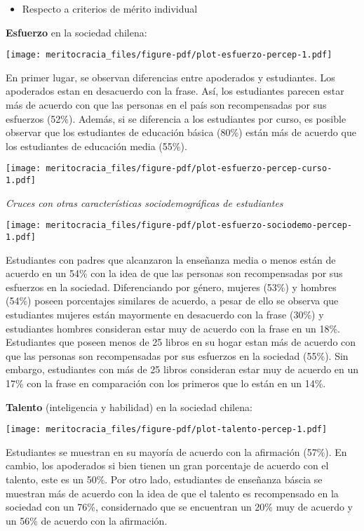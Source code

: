 \documentclass[
  letterpaper,
  DIV=11,
  numbers=noendperiod]{scrreprt}
\providecommand{\tightlist}{%
  \setlength{\itemsep}{0pt}\setlength{\parskip}{0pt}}\usepackage{longtable,booktabs,array}
\begin{document}
\begin{itemize}
\tightlist
\item
  Respecto a criterios de mérito individual
\end{itemize}

\textbf{Esfuerzo} en la sociedad chilena:

\texttt{[image: meritocracia\_files/figure-pdf/plot-esfuerzo-percep-1.pdf]}

En primer lugar, se observan diferencias entre apoderados y estudiantes.
Los apoderados estan en desacuerdo con la frase. Así, los estudiantes
parecen estar más de acuerdo con que las personas en el país son
recompensadas por sus esfuerzos (52\%). Además, si se diferencia a los
estudiantes por curso, es posible observar que los estudiantes de
educación básica (80\%) están más de acuerdo que los estudiantes de
educación media (55\%).

\texttt{[image: meritocracia\_files/figure-pdf/plot-esfuerzo-percep-curso-1.pdf]}

\emph{Cruces con otras características sociodemográficas de estudiantes}

\texttt{[image: meritocracia\_files/figure-pdf/plot-esfuerzo-sociodemo-percep-1.pdf]}

Estudiantes con padres que alcanzaron la enseñanza media o menos están
de acuerdo en un 54\% con la idea de que las personas son recompensadas
por sus esfuerzos en la sociedad. Diferenciando por género, mujeres
(53\%) y hombres (54\%) poseen porcentajes similares de acuerdo, a pesar
de ello se observa que estudiantes mujeres están mayormente en
desacuerdo con la frase (30\%) y estudiantes hombres consideran estar
muy de acuerdo con la frase en un 18\%. Estudiantes que poseen menos de
25 libros en su hogar estan más de acuerdo con que las personas son
recompensadas por sus esfuerzos en la sociedad (55\%). Sin embargo,
estudiantes con más de 25 libros consideran estar muy de acuerdo en un
17\% con la frase en comparación con los primeros que lo están en un
14\%.

\textbf{Talento} (inteligencia y habilidad) en la sociedad chilena:

\texttt{[image: meritocracia\_files/figure-pdf/plot-talento-percep-1.pdf]}

Estudiantes se muestran en su mayoría de acuerdo con la afirmación
(57\%). En cambio, los apoderados si bien tienen un gran porcentaje de
acuerdo con el talento, este es un 50\%. Por otro lado, estudiantes de
enseñanza báscia se muestran más de acuerdo con la idea de que el
talento es recompensado en la sociedad con un 76\%, considernado que se
encuentran un 20\% muy de acuerdo y un 56\% de acuerdo con la
afirmación.
\end{document}
